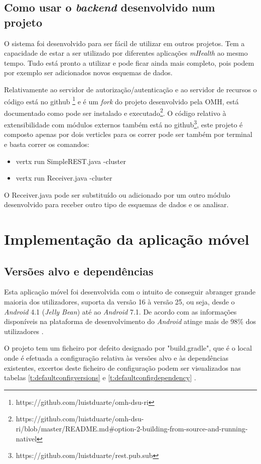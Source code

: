 \subsection{Como usar o \textit{backend} desenvolvido num projeto}
O sistema foi desenvolvido para ser fácil de utilizar em outros projetos. Tem a capacidade de estar a ser utilizado por diferentes aplicações \textit{mHealth} ao mesmo tempo. Tudo está pronto a utilizar e pode ficar ainda mais completo, pois podem por exemplo ser adicionados novos esquemas de dados. \par 
Relativamente ao servidor de autorização/autenticação e ao servidor de recursos o código está no github \footnote{https://github.com/luistduarte/omh-dsu-ri} e é um \textit{fork} do projeto desenvolvido pela \gls{OMH}, está documentado como pode ser instalado e executado\footnote{https://github.com/luistduarte/omh-dsu-ri/blob/master/README.md\#option-2-building-from-source-and-running-nativel}.
O código relativo à extensibilidade com módulos externos também está no github\footnote{https://github.com/luistduarte/rest.pub.sub}, este projeto é composto apenas por dois verticles para os correr pode ser também por terminal e basta correr os comandos:
\begin{itemize}
    \item vertx run SimpleREST.java -cluster
    \item vertx run Receiver.java -cluster
\end{itemize}
O Receiver.java pode ser substituído ou adicionado por um outro módulo desenvolvido para receber outro tipo de esquemas de dados e os analisar.

\section{Implementação da aplicação móvel}
\subsection{Versões alvo e dependências}
Esta aplicação móvel foi desenvolvida com o intuito de conseguir abranger grande maioria dos utilizadores, suporta da versão 16 à versão 25, ou seja,  desde o \textit{Android} 4.1 (\textit{Jelly Bean}) até ao \textit{Android} 7.1. De acordo com as informações disponíveis na plataforma de desenvolvimento do \textit{Android} atinge mais de 98\% dos utilizadores \cite{android-versions}.

O projeto tem um ficheiro por defeito designado por "build.gradle", que é o local onde é efetuada a configuração relativa às versões alvo e às dependências existentes, excertos deste ficheiro de configuração podem ser visualizados nas tabelas \ref{t:defaultconfigversions} e \ref{t:defaultconfigdependency} .


